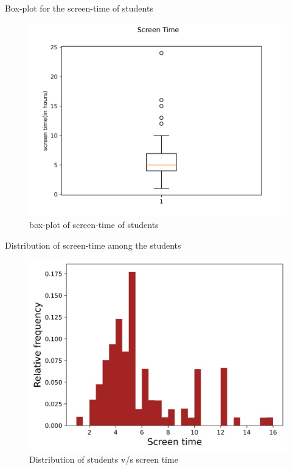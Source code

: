 \documentclass{beamer}
\begin{document}
\begin{frame}
\begin{block}{Box-plot for the screen-time of students}
\begin{figure}[hbtp]
\caption{box-plot of screen-time of students}
\centering
\includegraphics[scale=0.55]{boxplot.png}
\end{figure}
\end{block}
\end{frame}

\begin{frame}
\begin{block}{Distribution of screen-time among the students}
\begin{figure}[hbtp]
\caption{Distribution of students v/s screen time}
\centering
\includegraphics[scale=0.20]{population.png}
\end{figure}
\end{block}
\end{frame}
\end{document}
